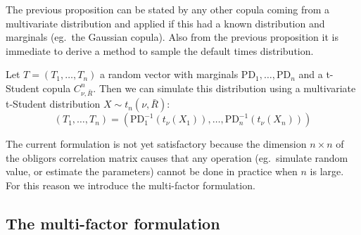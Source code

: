 \documentclass[11pt,fleqn]{book} %
\begin{document}
The previous proposition can be stated by any other copula coming from
a multivariate distribution and applied if this had a known distribution 
and marginals (eg.\ the Gaussian copula). Also from the previous proposition
it is immediate to derive a method to sample the default times distribution.

\begin{corollary}
	\label{cor:dts1}
	Let $T=(T_1, \dots, T_n)$ a random vector with marginals 
	$\text{PD}_1, \dots, \text{PD}_n$ and a t-Student copula $C_{\nu,\bar{R}}^n$. 
	Then we can simulate this distribution using a multivariate t-Student 
	distribution $X \sim t_n(\nu,\bar{R})$:
	\begin{displaymath}
		(T_1, \dots, T_n) = \left(\text{PD}_1^{-1}\left(t_{\nu}(X_1)\right), \dots, \text{PD}_n^{-1}\left(t_{\nu}(X_n)\right)\right)
	\end{displaymath}
\end{corollary}

The current formulation is not yet satisfactory because the dimension 
$n {\times} n$ of the obligors correlation matrix causes that any 
operation (eg.\ simulate random value, or estimate the parameters) cannot 
be done in practice when $n$ is large. For this reason we introduce the
multi-factor formulation.

\subsection{The multi-factor formulation}
\end{document}
